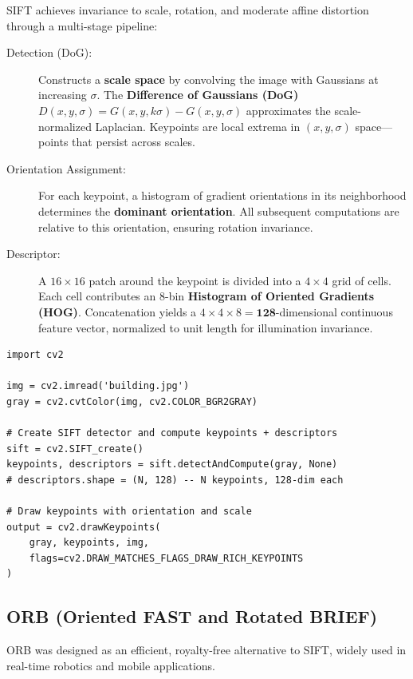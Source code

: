 SIFT achieves invariance to scale, rotation, and moderate affine distortion through a multi-stage pipeline:

\begin{description}
    \item[Detection (DoG):] Constructs a \textbf{scale space} by convolving the image with Gaussians at increasing $\sigma$. The \textbf{Difference of Gaussians (DoG)} $D(x,y,\sigma) = G(x,y,k\sigma) - G(x,y,\sigma)$ approximates the scale-normalized Laplacian. Keypoints are local extrema in $(x, y, \sigma)$ space---points that persist across scales.
    \item[Orientation Assignment:] For each keypoint, a histogram of gradient orientations in its neighborhood determines the \textbf{dominant orientation}. All subsequent computations are relative to this orientation, ensuring rotation invariance.
    \item[Descriptor:] A $16 \times 16$ patch around the keypoint is divided into a $4 \times 4$ grid of cells. Each cell contributes an 8-bin \textbf{Histogram of Oriented Gradients (HOG)}. Concatenation yields a $4 \times 4 \times 8 = \mathbf{128}$-dimensional continuous feature vector, normalized to unit length for illumination invariance.
\end{description}

\begin{lstlisting}[style=pythonstyle]
import cv2

img = cv2.imread('building.jpg')
gray = cv2.cvtColor(img, cv2.COLOR_BGR2GRAY)

# Create SIFT detector and compute keypoints + descriptors
sift = cv2.SIFT_create()
keypoints, descriptors = sift.detectAndCompute(gray, None)
# descriptors.shape = (N, 128) -- N keypoints, 128-dim each

# Draw keypoints with orientation and scale
output = cv2.drawKeypoints(
    gray, keypoints, img,
    flags=cv2.DRAW_MATCHES_FLAGS_DRAW_RICH_KEYPOINTS
)
\end{lstlisting}

\subsection*{ORB (Oriented FAST and Rotated BRIEF)}

ORB was designed as an efficient, royalty-free alternative to SIFT, widely used in real-time robotics and mobile applications.

